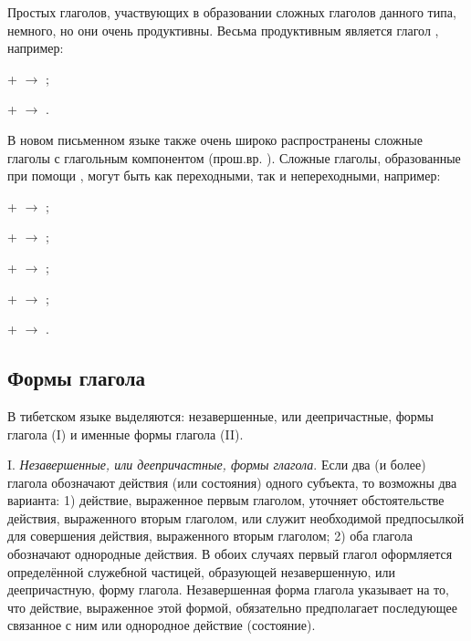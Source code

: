 Простых глаголов, участвующих в образовании сложных глаголов данного типа, немного, но они очень продуктивны. Весьма продуктивным является глагол , например:
\begin{prfsample}
	\item {} +  $\rightarrow$ ;
	\item {} +  $\rightarrow$ .
\end{prfsample}

В новом письменном языке также очень широко распространены сложные глаголы с глагольным компонентом  (прош.вр. ). Сложные глаголы, образованные при помощи , могут быть как переходными, так и непереходными, например:
\begin{prfsample}
	\item {} +  $\rightarrow$ ;
	\item {} +  $\rightarrow$ ;
	\item {} +  $\rightarrow$ ;
	\item {} +  $\rightarrow$ ;
	\item {} +  $\rightarrow$ .
\end{prfsample}

\subsection{Формы глагола}

В тибетском языке выделяются: незавершенные, или деепричастные, формы глагола (I) и именные формы глагола (II).

I. \emph{Незавершенные, или деепричастные, формы глагола}. Если два (и более) глагола обозначают действия (или состояния) одного субъекта, то возможны два варианта: 1) действие, выраженное первым глаголом, уточняет обстоятельстве действия, выраженного вторым глаголом, или служит необходимой предпосылкой для совершения действия, выраженного вторым глаголом; 2) оба глагола обозначают однородные действия. В обоих случаях первый глагол оформляется определённой служебной частицей, образующей незавершенную, или деепричастную, форму глагола. Незавершенная форма глагола указывает на то, что действие, выраженное этой формой, обязательно предполагает последующее связанное с ним или однородное действие (состояние).

